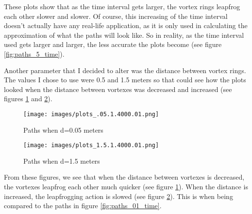 \documentclass{article}
\begin{document}
These plots show that as the time interval gets larger, the vortex rings leapfrog each other slower and slower. Of course, this increasing of the time interval doesn't actually have any real-life application, as it is only used in calculating the approximation of what the paths will look like. So in reality, as the time interval used gets larger and larger, the less accurate the plots become (see figure \ref{fig:paths_5_time}).

Another parameter that I decided to alter was the distance between vortex rings. The values I chose to use were 0.5 and 1.5 meters so that could see how the plots looked when the distance between vortexes was decreased and increased (see figures \ref{fig:paths_.05_distance} and \ref{fig:paths_1.5_distance}).

\begin{figure}[ht]
\centering
\texttt{[image: images/plots\_.05.1.4000.01.png]}
\caption{Paths when d=0.05 meters}
\label{fig:paths_.05_distance}
\end{figure}

\begin{figure}[ht]
\centering
\texttt{[image: images/plots\_1.5.1.4000.01.png]}
\caption{Paths when d=1.5 meters}
\label{fig:paths_1.5_distance}
\end{figure}

From these figures, we see that when the distance between vortexes is decreased, the vortexes leapfrog each other much quicker (see figure \ref{fig:paths_.05_distance}). When the distance is increased, the leapfrogging action is slowed (see figure \ref{fig:paths_1.5_distance}). This is when being compared to the paths in figure \ref{fig:paths_01_time}.
\end{document}
